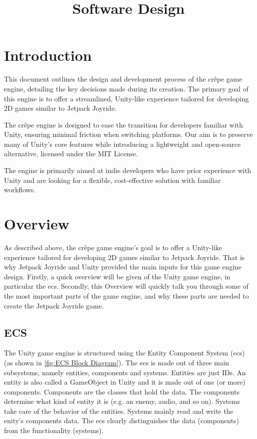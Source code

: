\documentclass{projdoc}
\title{Software Design}
\begin{document}
\tablestables
\newpage

\section{Introduction}

This document outlines the design and development process of the cr\^epe game engine,
detailing the key decisions made during its creation. The primary goal of this engine
is to offer a streamlined, Unity-like experience tailored for developing 2D games
similar to Jetpack Joyride.

The cr\^epe engine is designed to ease the transition for developers familiar with
Unity, ensuring minimal friction when switching platforms. Our aim is to preserve
many of Unity’s core features while introducing a lightweight and open-source
alternative, licensed under the MIT License.

The engine is primarily aimed at indie developers who have prior experience with
Unity and are looking for a flexible, cost-effective solution with familiar
workflows.

\section{Overview}
As described above, the cr\^epe game engine's goal is to offer a Unity-like experience
tailored for developing 2D games similar to Jetpack Joyride. That is why Jetpack
Joyride and Unity provided the main inputs for this game engine design. Firstly, a
quick overview will be given of the Unity game engine, in particular the \gls{ecs}.
Secondly, this Overview will quickly talk you through some of the most important
parts of the game engine, and why these parts are needed to create the Jetpack
Joyride game.

\subsection{ECS}
The Unity game engine is structured using the Entity Component System (\gls{ecs})
(as shown in \cref{fig:ECS Block Diagram}). The \gls{ecs} is made out of three
main subsystems, namely entities, components and systems. Entities are just IDs.
An entity is also called a GameObject in Unity and it is made out of one (or
more) components. Components are the classes that hold the data. The components
determine what kind of entity it is (e.g. an enemy, audio, and so on). Systems take
care of the behavior of the entities. Systems mainly read and write the enity's
components data. The \gls{ecs} clearly distinguishes the data (components) from the
functionality (systems).
\end{document}
